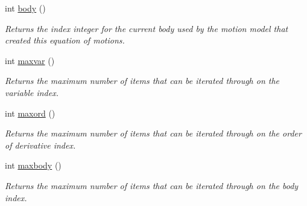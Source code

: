 \begin{DoxyCompactItemize}
int \hyperlink{class_equationof_motion_ac87fe1d5112f5b42f9afd5f1c3b9002c}{body} ()
\begin{DoxyCompactList}\small\item\em Returns the index integer for the current body used by the motion model that created this equation of motions. \end{DoxyCompactList}\item 
int \hyperlink{class_equationof_motion_a8c6367e13c8f027f4a0936b821ff9363}{maxvar} ()
\begin{DoxyCompactList}\small\item\em Returns the maximum number of items that can be iterated through on the variable index. \end{DoxyCompactList}\item 
int \hyperlink{class_equationof_motion_ad8271e1cc1d78b7bf80a90fe3c3b06b4}{maxord} ()
\begin{DoxyCompactList}\small\item\em Returns the maximum number of items that can be iterated through on the order of derivative index. \end{DoxyCompactList}\item 
int \hyperlink{class_equationof_motion_a0fea5098961fce0004b978223b4a501b}{maxbody} ()
\begin{DoxyCompactList}\small\item\em Returns the maximum number of items that can be iterated through on the body index. \end{DoxyCompactList}\end{DoxyCompactItemize}
